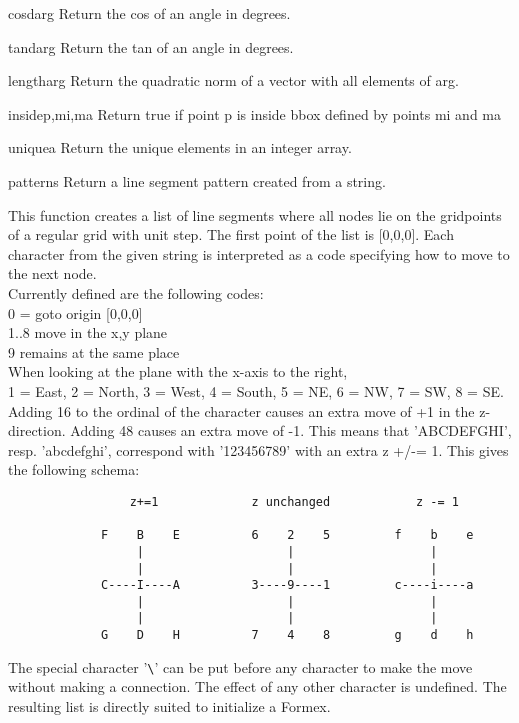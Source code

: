{{\begin{funcdesc}{cosd}{arg}
    Return the cos of an angle in degrees.
\end{funcdesc}

\begin{funcdesc}{tand}{arg}
    Return the tan of an angle in degrees.
\end{funcdesc}

\begin{funcdesc}{length}{arg}
    Return the quadratic norm of a vector with all elements of arg.
\end{funcdesc}

\begin{funcdesc}{inside}{p,mi,ma}
    Return true if point p is inside bbox defined by points mi and ma
\end{funcdesc}

\begin{funcdesc}{unique}{a}
    Return the unique elements in an integer array.
\end{funcdesc}

\begin{funcdesc}{pattern}{s}
Return a line segment pattern created from a string.

This function creates a list of line segments where all nodes lie on the gridpoints of a regular grid with unit step.
The first point of the list is [0,0,0]. Each character from the given string is interpreted as a code specifying how to move to the next node.\\
Currently defined are the following codes:\\
0 = goto origin [0,0,0]\\
1..8 move in the x,y plane\\
9 remains at the same place\\
When looking at the plane with the x-axis to the right,\\
1 = East, 2 = North, 3 = West, 4 = South, 5 = NE, 6 = NW, 7 = SW, 8 = SE.\\
Adding 16 to the ordinal of the character causes an extra move of +1 in the z-direction. Adding 48 causes an extra move of -1. This means that 'ABCDEFGHI', resp. 'abcdefghi', correspond with '123456789' with an extra z +/-= 1. This gives the following schema:
\begin{verbatim}
                 z+=1             z unchanged            z -= 1
            
             F    B    E          6    2    5         f    b    e 
                  |                    |                   |     
                  |                    |                   |     
             C----I----A          3----9----1         c----i----a  
                  |                    |                   |     
                  |                    |                   |     
             G    D    H          7    4    8         g    d    h
\end{verbatim}             
The special character '\verb?\?' can be put before any character to make the move without making a connection. The effect of any other character is undefined. The resulting list is directly suited to initialize a Formex.
\end{funcdesc}


}}
